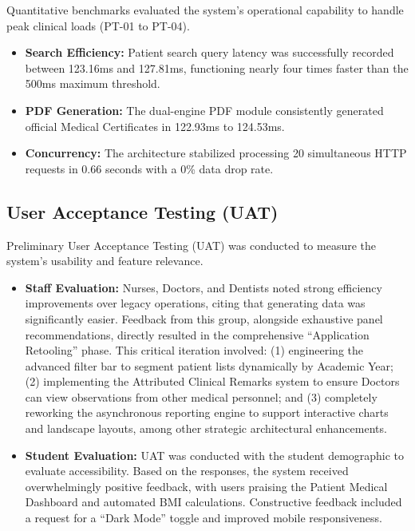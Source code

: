 Quantitative benchmarks evaluated the system's operational capability to handle peak clinical loads (PT-01 to PT-04).

\begin{itemize}
    \item \textbf{Search Efficiency:} Patient search query latency was successfully recorded between 123.16ms and 127.81ms, functioning nearly four times faster than the 500ms maximum threshold.
    \item \textbf{PDF Generation:} The dual-engine PDF module consistently generated official Medical Certificates in 122.93ms to 124.53ms.
    \item \textbf{Concurrency:} The architecture stabilized processing 20 simultaneous HTTP requests in 0.66 seconds with a 0\% data drop rate.
\end{itemize}

\subsection{User Acceptance Testing (UAT)}

Preliminary User Acceptance Testing (UAT) was conducted to measure the system's usability and feature relevance.

\begin{itemize}
    \item \textbf{Staff Evaluation:} Nurses, Doctors, and Dentists noted strong efficiency improvements over legacy operations, citing that generating data was significantly easier. Feedback from this group, alongside exhaustive panel recommendations, directly resulted in the comprehensive ``Application Retooling'' phase. This critical iteration involved: (1) engineering the advanced filter bar to segment patient lists dynamically by Academic Year; (2) implementing the Attributed Clinical Remarks system to ensure Doctors can view observations from other medical personnel; and (3) completely reworking the asynchronous reporting engine to support interactive charts and landscape layouts, among other strategic architectural enhancements.
    \item \textbf{Student Evaluation:} UAT was conducted with the student demographic to evaluate accessibility. Based on the responses, the system received overwhelmingly positive feedback, with users praising the Patient Medical Dashboard and automated BMI calculations. Constructive feedback included a request for a ``Dark Mode'' toggle and improved mobile responsiveness.
\end{itemize}

